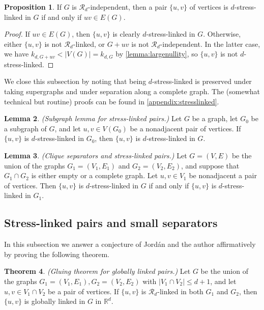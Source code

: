 \documentclass[11pt,a4paper,dvipsnames]{scrartcl}
\theoremstyle{definition}
\newtheorem{theorem}{Theorem}[section]
\newtheorem{lemma}[theorem]{Lemma}
\newtheorem{proposition}[theorem]{Proposition}
\newcommand{\RR}{\mathbb{R}}
\newcommand{\stressnullity}[1]{k_{d, #1}}
\newcommand{\strongly}[1]{${#1}$-stress-linked}
\begin{document}
\begin{proposition}
    If $G$ is $\mathcal{R}_d$-independent, then a pair $\{u,v\}$ of vertices is \strongly{d} in $G$ if and only if $uv \in E(G)$.
\end{proposition}
\begin{proof}
    If $uv \in E(G)$, then $\{u,v\}$ is clearly \strongly{d} in $G$. Otherwise, either $\{u,v\}$ is not $\mathcal{R}_d$-linked, or $G+uv$ is not $\mathcal{R}_d$-independent. In the latter case, we have $\stressnullity{G+uv} <  |V(G)| = \stressnullity{G}$ by \cref{lemma:largenullity}, so $\{u,v\}$ is not \strongly{d}.
\end{proof}

We close this subsection by noting that being \strongly{d} is preserved under taking supergraphs and under separation along a complete graph. The (somewhat technical but routine) proofs can be found in \cref{appendix:stresslinked}.

\begin{lemma}\label{lemma:stronglylinkedsubgraph} \emph{(Subgraph lemma for stress-linked pairs.)}\newline
    Let $G$ be a graph, let $G_0$ be a subgraph of $G$, and let $u,v \in V(G_0)$ be a nonadjacent pair of vertices. If $\{u,v\}$ is \strongly{d} in $G_0$, then $\{u,v\}$ is \strongly{d} in $G$.
\end{lemma}


\begin{lemma}\label{lemma:completeseparator}\emph{(Clique separators and stress-linked pairs.)}\newline
    Let $G = (V,E)$ be the union of the graphs $G_1 = (V_1,E_1)$ and $G_2 = (V_2,E_2)$, and suppose that $G_1 \cap G_2$ is either empty or a complete graph. Let $u,v \in V_1$ be nonadjacent a pair of vertices. Then $\{u,v\}$ is \strongly{d} in $G$ if and only if $\{u,v\}$ is \strongly{d} in $G_1$.
\end{lemma}


\subsection{Stress-linked pairs and small separators}

In this subsection we answer a conjecture of Jordán and the author affirmatively by proving the following theorem.

\begin{theorem}\label{conjecture:gluing}\cite[Conjecture 5.6]{garamvolgyi.jordan_2023a} \emph{(Gluing theorem for globally linked pairs.)} \newline
    Let $G$ be the union of the graphs $G_1 = (V_1,E_1), G_2 = (V_2,E_2)$ with $|V_1 \cap V_2| \leq d+1$, and let $u,v \in V_1 \cap V_2$ be a pair of vertices. If $\{u,v\}$ is $\mathcal{R}_d$-linked in both $G_1$ and $G_2$, then $\{u,v\}$ is globally linked in $G$ in $\RR^d$.
\end{theorem}
\end{document}
